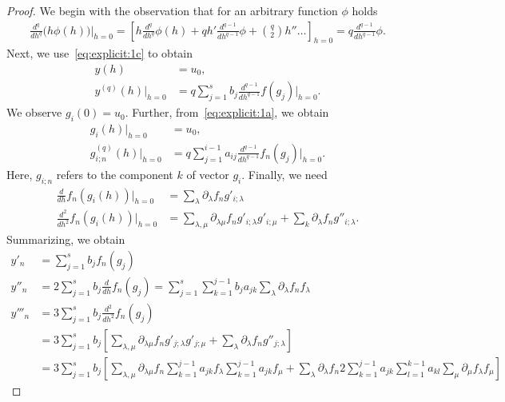 

\begin{proof}
  We begin with the observation that for an arbitrary function $\phi$ holds
  \begin{gather*}
     \frac{d^{q}}{d h^{q}}\bigl(h\phi(h)\bigr)\bigg|_{h=0}
     = \left[ h \frac{d^{q}}{d h^{q}} \phi(h) + q h'
       \frac{d^{q-1}}{d h^{q-1}} \phi + \binom{q}{2}
       h''\dots\right]_{h=0}
     = q \frac{d^{q-1}}{d h^{q-1}} \phi.
  \end{gather*}
  Next, we use~\eqref{eq:explicit:1c} to obtain
  \begin{align*}
    y(h) &= u_0, \\
    y^{(q)}(h)\big|_{h=0} &= q \sum_{j=1}^s b_j \frac{d^{q-1}}{d h^{q-1}} f(g_j)\bigg|_{h=0}.
  \end{align*}
  We observe $g_i(0) = u_0$. Further, from~\eqref{eq:explicit:1a}, we
  obtain
  \begin{align*}
    g_i(h)\big|_{h=0} &= u_0, \\
    g_{i;n}^{(q)}(h)\big|_{h=0} &= q \sum_{j=1}^{i-1} a_{ij}
                                  \frac{d^{q-1}}{d h^{q-1}} f_n(g_{j})\bigg|_{h=0}.
  \end{align*}
  Here, $g_{i;n}$ refers to the component $k$ of vector
  $g_i$. Finally, we need
  \begin{align*}
    \frac{d}{d h} f_n(g_i(h))\big|_{h=0}
    & = \sum_{\lambda} \partial_{\lambda} f_n g'_{i;\lambda}\\
    \frac{d^2}{d h^2} f_n(g_i(h))\big|_{h=0}
    & = \sum_{\lambda,\mu} \partial_{\lambda\mu} f_n g'_{i;\lambda} g'_{i;\mu}
      + \sum_k \partial_{\lambda} f_n g''_{i;\lambda}.
  \end{align*}
  Summarizing, we obtain
  \begin{align*}
    y'_n &= \sum_{j=1}^s b_j f_n(g_j)
    \\
    y''_n &= 2 \sum_{j=1}^s b_j\frac{d}{d h} f_n(g_j)
    = \sum_{j=1}^s \sum_{k=1}^{j-1} b_j a_{j k}
            \sum_{\lambda} \partial_{\lambda} f_n f_\lambda
    \\
    y'''_n &= 3 \sum_{j=1}^s b_j\frac{d^2}{d h^2} f_n(g_j)
    \\&= 3 \sum_{j=1}^s b_j \left[
      \sum_{\lambda,\mu} \partial_{\lambda\mu} f_n g'_{j;\lambda} g'_{j;\mu}
      + \sum_\lambda \partial_{\lambda} f_n g''_{j;\lambda}\right]
    \\&= 3 \sum_{j=1}^s b_j \left[
        \sum_{\lambda,\mu} \partial_{\lambda\mu} f_n \sum_{k=1}^{j-1} a_{j k}
        f_\lambda \sum_{k=1}^{j-1} a_{j k}
        f_\mu + \sum_{\lambda} \partial_{\lambda} f_n 2 \sum_{k=1}^{j-1}
        a_{j k} \sum_{l=1}^{k-1} a_{kl} \sum_\mu \partial_\mu f_\lambda f_\mu
        \right]
  \end{align*}
\end{proof}

